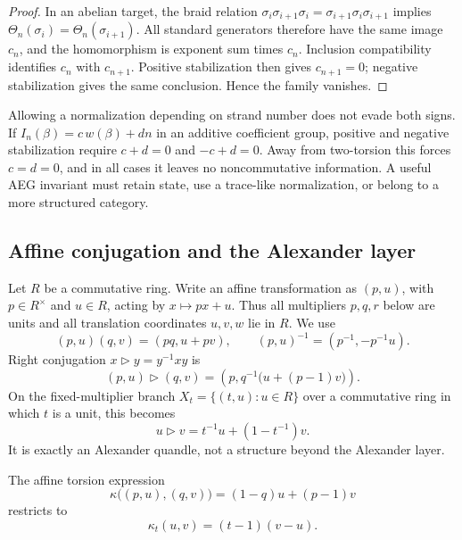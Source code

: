 \begin{proof}
In an abelian target, the braid relation
$\sigma_i\sigma_{i+1}\sigma_i=\sigma_{i+1}\sigma_i\sigma_{i+1}$ implies
$\Theta_n(\sigma_i)=\Theta_n(\sigma_{i+1})$.  All standard generators therefore
have the same image $c_n$, and the homomorphism is exponent sum times $c_n$.
Inclusion compatibility identifies $c_n$ with $c_{n+1}$.  Positive stabilization
then gives $c_{n+1}=0$; negative stabilization gives the same conclusion.  Hence
the family vanishes.
\end{proof}

Allowing a normalization depending on strand number does not evade both signs.  If
$I_n(\beta)=c\,w(\beta)+d n$ in an additive coefficient group, positive and
negative stabilization require $c+d=0$ and $-c+d=0$.  Away from two-torsion this
forces $c=d=0$, and in all cases it leaves no noncommutative information.  A useful
AEG invariant must retain state, use a trace-like normalization, or belong to a
more structured category.

\subsection{Affine conjugation and the Alexander layer}

Let $R$ be a commutative ring.  Write an affine transformation as $(p,u)$, with
$p\in R^\times$ and $u\in R$, acting by $x\mapsto px+u$.  Thus all multipliers
$p,q,r$ below are units and all translation coordinates $u,v,w$ lie in $R$.  We use
\begin{equation}
 (p,u)(q,v)=(pq,u+pv),
 \qquad
 (p,u)^{-1}=(p^{-1},-p^{-1}u).
 \label{eq:affine-group-law}
\end{equation}
Right conjugation $x\triangleright y=y^{-1}xy$ is
\begin{equation}
 (p,u)\triangleright(q,v)
 =\left(p,q^{-1}\bigl(u+(p-1)v\bigr)\right).
 \label{eq:affine-conjugation}
\end{equation}
On the fixed-multiplier branch
$X_t=\{(t,u):u\in R\}$ over a commutative ring in which $t$ is a unit, this becomes
\begin{equation}
 u\triangleright v=t^{-1}u+(1-t^{-1})v.
 \label{eq:alexander-quandle-operation}
\end{equation}
It is exactly an Alexander quandle, not a structure beyond the Alexander layer.

The affine torsion expression
\begin{equation}
 \kappa\bigl((p,u),(q,v)\bigr)=(1-q)u+(p-1)v
 \label{eq:affine-torsion}
\end{equation}
restricts to
\begin{equation}
 \kappa_t(u,v)=(t-1)(v-u).
 \label{eq:fixed-torsion}
\end{equation}

